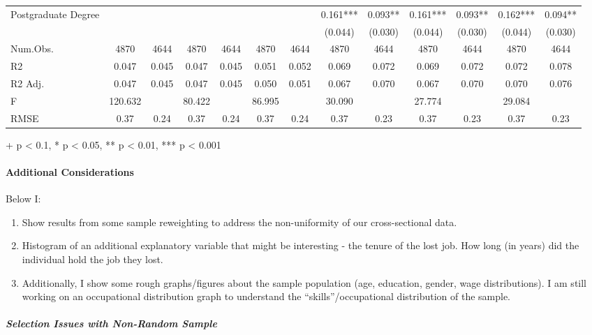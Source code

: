 \documentclass[
]{article}
\providecommand{\tightlist}{%
  \setlength{\itemsep}{0pt}\setlength{\parskip}{0pt}}
\begin{document}
\begin{table}[t]
\begin{tabular*}{\linewidth}{@{\extracolsep{\fill}}lcccccccccccc}
Postgraduate Degree &  &  &  &  &  &  & 0.161*** & 0.093** & 0.161*** & 0.093** & 0.162*** & 0.094** \\ 
{} & {} & {} & {} & {} & {} & {} & {(0.044)} & {(0.030)} & {(0.044)} & {(0.030)} & {(0.044)} & {(0.030)} \\ 
Num.Obs. & 4870 & 4644 & 4870 & 4644 & 4870 & 4644 & 4870 & 4644 & 4870 & 4644 & 4870 & 4644 \\ 
R2 & 0.047 & 0.045 & 0.047 & 0.045 & 0.051 & 0.052 & 0.069 & 0.072 & 0.069 & 0.072 & 0.072 & 0.078 \\ 
R2 Adj. & 0.047 & 0.045 & 0.047 & 0.045 & 0.050 & 0.051 & 0.067 & 0.070 & 0.067 & 0.070 & 0.070 & 0.076 \\ 
F & 120.632 &  & 80.422 &  & 86.995 &  & 30.090 &  & 27.774 &  & 29.084 &  \\ 
RMSE & 0.37 & 0.24 & 0.37 & 0.24 & 0.37 & 0.24 & 0.37 & 0.23 & 0.37 & 0.23 & 0.37 & 0.23 \\ 
\bottomrule
\end{tabular*}
\begin{minipage}{\linewidth}
+ p < 0.1, * p < 0.05, ** p < 0.01, *** p < 0.001\\
\end{minipage}
\end{table}

\paragraph{Additional Considerations}\label{additional-considerations}

Below I:

\begin{enumerate}
\def\labelenumi{\arabic{enumi}.}
\tightlist
\item
  Show results from some sample reweighting to address the
  non-uniformity of our cross-sectional data.
\item
  Histogram of an additional explanatory variable that might be
  interesting - the tenure of the lost job. How long (in years) did the
  individual hold the job they lost.
\item
  Additionally, I show some rough graphs/figures about the sample
  population (age, education, gender, wage distributions). I am still
  working on an occupational distribution graph to understand the
  ``skills''/occupational distribution of the sample.
\end{enumerate}

\subparagraph{Selection Issues with Non-Random
Sample}\label{selection-issues-with-non-random-sample}
\end{document}
